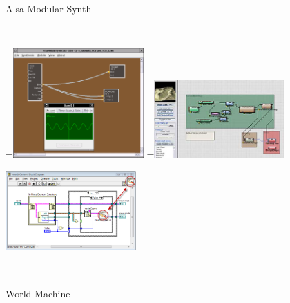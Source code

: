 \documentclass{article}
\begin{document}
\begin{figure}[ht]
  
  {\,}
  \hfill 
  \begin{minipage}{5cm}
    \centering
    \caption{Alsa Modular Synth\cite{alsa-modular-synth}}
    \label{fig:alsa-modular-synth}
  \end{minipage}
  \hfill
  \begin{minipage}{5cm}
    \centering
    \caption{World Machine\cite{world-machine}}
    \label{fig:world-machine}
  \end{minipage}
  \hfill
  {\,} 
  
  
  =\hbox{\includegraphics[width=5cm]{alsa-modular-synth}}%
  =\hbox{\includegraphics[width=5cm]{world-machine}}%
  {\,}
  \hfill 
  \begin{minipage}{5cm}
    \centering
  \end{minipage}
  \hfill
  \begin{minipage}{5cm}
    \centering
    \includegraphics[width=5cm]{labview}
  \end{minipage}
  \hfill
  {\,}
  

\end{figure}
\end{document}
